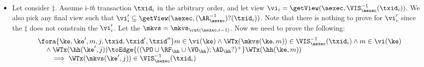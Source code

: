 \begin{itemize}
\item Let consider \( \ddagger \).
Assume i-\emph{th} transaction \( \txid_i \) in the arbitrary order,
and let view \( \vi_{i} = \getView(\aexec, \VIS^{-1}_{\aexec}(\txid_{i}) ) \).
We also pick any final view such that \( \vi'_{i} \subseteq \getView(\aexec, (\AR^{-1}_{\aexec})?(\txid_{i}) ) \).
Note that there is nothing to prove for \( \vi'_i \) since the \( \ddagger \) does not constrain the \( \vi'_i \).
Let the \( \mkvs = \mkvs_{\cut(\aexec, i-1)} \).
Now we need to prove the following:
\begin{gather}
    \label{equ:si-complete-arvis}
    \begin{array}{@{}l@{}}
        \fora{\ke, \ke', m, j, \txid, \txid', \txid''} 
        m \in \vi(\ke) 
        \land \WTx(\mkvs(\ke,m)) \in \VIS^{-1}_{\aexec}(\txid_{i})
        \land m \in \vi(\ke)  \\
        \quad {} \wedge \WTx(\hh(\ke', j)) \toEdge{((\PO \cup \RF_{\hh} \cup \VO_{\hh}) ; \AD_{\hh}?)^{+}} \WTx(\hh(\ke, m)) \\
        \qquad \implies \WTx(\mkvs(\ke',j)) \in \VIS^{-1}_{\aexec}(\txid_{i})
    \end{array} 
\end{gather}

\end{itemize}

